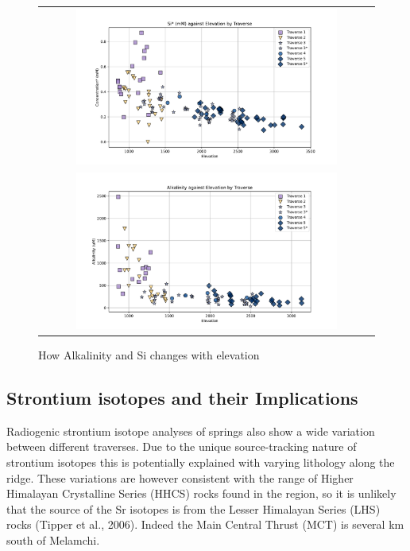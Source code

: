 \begin{figure}[h]
    \centering
    \begin{tabular}{c}
        \includegraphics[width=0.8\textwidth]{Si_mM_EC_Elevation.pdf} \\
        \includegraphics[width=0.8\textwidth]{Alkalinity_Elevation.pdf} \\
    \end{tabular}
    \caption{How Alkalinity and Si changes with elevation}
    \label{fig:spatial_changes_spring2}
\end{figure}

\FloatBarrier

\newpage


\subsection{Strontium isotopes and their Implications}

Radiogenic strontium isotope analyses of springs also show a wide variation between different traverses. Due to the unique source-tracking nature of strontium isotopes this is potentially explained with varying lithology along the ridge. These variations are however consistent with the range of Higher Himalayan Crystalline Series (HHCS) rocks found in the region, so it is unlikely that the source of the Sr isotopes is from the Lesser Himalayan Series (LHS) rocks (Tipper et al., 2006). Indeed the Main Central Thrust (MCT) is several km south of Melamchi.

